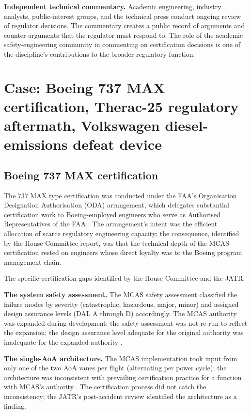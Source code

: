 \textbf{Independent technical commentary.} Academic engineering, industry analysts, public-interest groups, and the technical press conduct ongoing review of regulator decisions. The commentary creates a public record of arguments and counter-arguments that the regulator must respond to. The role of the academic safety-engineering community in commenting on certification decisions is one of the discipline's contributions to the broader regulatory function.

\section{Case: Boeing 737 MAX certification, Therac-25 regulatory aftermath, Volkswagen diesel-emissions defeat device}

\subsection*{Boeing 737 MAX certification}

The 737 MAX type certification was conducted under the FAA's Organisation Designation Authorisation (ODA) arrangement, which delegates substantial certification work to Boeing-employed engineers who serve as Authorised Representatives of the FAA \cite{acc:house-737max-2020}. The arrangement's intent was the efficient allocation of scarce regulatory engineering capacity; the consequence, identified by the House Committee report, was that the technical depth of the MCAS certification rested on engineers whose direct loyalty was to the Boeing program management chain.

The specific certification gaps identified by the House Committee and the JATR:

\textbf{The system safety assessment.} The MCAS safety assessment classified the failure modes by severity (catastrophic, hazardous, major, minor) and assigned design assurance levels (DAL A through D) accordingly. The MCAS authority was expanded during development; the safety assessment was not re-run to reflect the expansion; the design assurance level adequate for the original authority was inadequate for the expanded authority \cite{acc:house-737max-2020}.

\textbf{The single-AoA architecture.} The MCAS implementation took input from only one of the two AoA vanes per flight (alternating per power cycle); the architecture was inconsistent with prevailing certification practice for a function with MCAS's authority \cite{acc:jatr-737max-2019}. The certification process did not catch the inconsistency; the JATR's post-accident review identified the architecture as a finding.

